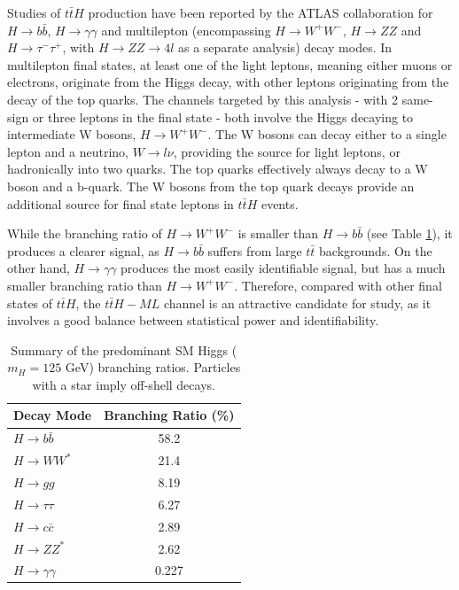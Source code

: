 Studies of $t\bar{t}H$ production have been reported by the ATLAS collaboration for $H\rightarrow b\bar{b}$, $H\rightarrow \gamma\gamma$ and multilepton (encompassing $H\rightarrow W^+W^-$, $H\rightarrow ZZ$ and $H\rightarrow \tau^-\tau^+$, with $H\rightarrow ZZ\rightarrow 4l$ as a separate analysis) decay modes. In multilepton final states, at least one of the light leptons, meaning either muons or electrons, originate from the Higgs decay, with other leptons originating from the decay of the top quarks. The channels targeted by this analysis - with 2 same-sign or three leptons in the final state - both involve the Higgs decaying to intermediate W bosons, $H\rightarrow W^+W^-$. The W bosons can decay either to a single lepton and a neutrino, $W\rightarrow l\nu$, providing the source for light leptons, or hadronically into two quarks. The top quarks effectively always decay to a W boson and a b-quark. The W bosons from the top quark decays provide an additional source for final state leptons in $t\bar{t}H$ events.

While the branching ratio of $H\rightarrow W^+W^-$ is smaller than $H \rightarrow b \bar{b}$ (see Table \ref{tab:H_BR}), it produces a clearer signal, as $H \rightarrow b \bar{b}$ suffers from large $t\bar{t}$ backgrounds. On the other hand, $H\rightarrow \gamma\gamma$ produces the most easily identifiable signal, but has a much smaller branching ratio than $H\rightarrow W^+W^-$. Therefore, compared with other final states of $t\bar{t}H$, the $t\bar{t}H-ML$ channel is an attractive candidate for study, as it involves a good balance between statistical power and identifiability. 

\begin{table}[H]
\centering
\begin{tabular}{lc}
\hline\hline
Decay Mode & Branching Ratio (\%) \\
\hline
$H \rightarrow b \bar{b}$ & 58.2 \\
$H\rightarrow WW^*$ & 21.4 \\
$H\rightarrow gg$ & 8.19 \\
$H\rightarrow \tau\tau$ & 6.27 \\
$H\rightarrow c\bar{c}$ & 2.89 \\
$H\rightarrow ZZ^*$ & 2.62 \\
$H\rightarrow \gamma\gamma$ & 0.227 \\
\hline
\end{tabular}
\label{tab:H_BR}
\caption{Summary of the predominant SM Higgs ($m_H = 125$ GeV) branching ratios. Particles with a star imply off-shell decays.}
\end{table} 

